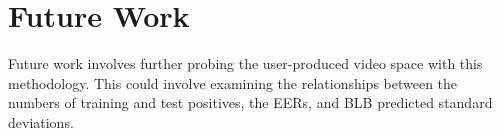 \section{Future Work}

Future work involves further probing the user-produced video space with this methodology.
This could involve examining the relationships between the numbers of training and test positives, the EERs, and BLB predicted standard deviations.